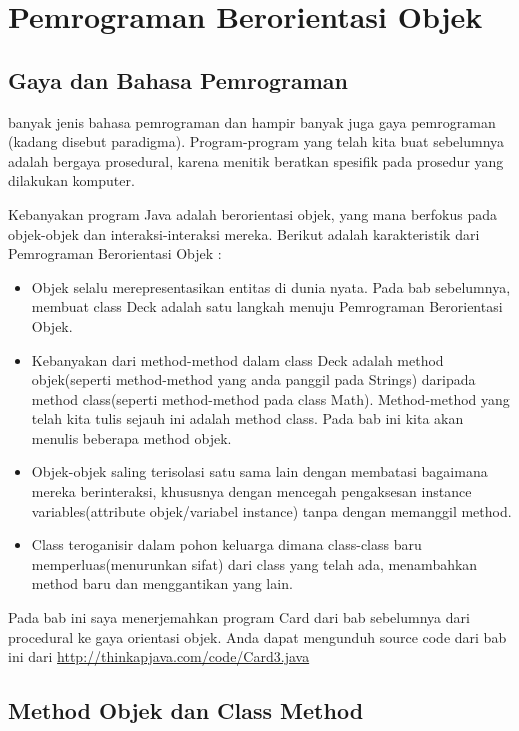 \chapter{Pemrograman Berorientasi Objek}
\section{Gaya dan Bahasa Pemrograman} %

banyak jenis bahasa pemrograman dan hampir banyak juga gaya pemrograman (kadang disebut paradigma). Program-program yang telah kita buat sebelumnya adalah bergaya prosedural, karena menitik beratkan spesifik pada prosedur yang dilakukan komputer.

Kebanyakan program Java adalah berorientasi objek, yang mana berfokus pada objek-objek dan interaksi-interaksi mereka. Berikut adalah karakteristik dari Pemrograman Berorientasi Objek :

\begin{itemize}
	\item{Objek selalu merepresentasikan entitas di dunia nyata. Pada bab sebelumnya, membuat class Deck adalah satu langkah menuju Pemrograman Berorientasi Objek.}
	\item{Kebanyakan dari method-method dalam class Deck adalah method objek(seperti method-method yang anda panggil pada Strings) daripada method class(seperti method-method pada class Math). Method-method yang telah kita tulis sejauh ini adalah method class. Pada bab ini kita akan menulis beberapa method objek.}
	\item{Objek-objek saling terisolasi satu sama lain 	dengan membatasi bagaimana mereka berinteraksi, khususnya dengan mencegah pengaksesan instance variables(attribute objek/variabel instance) tanpa dengan memanggil method.}
	\item{Class teroganisir dalam pohon keluarga dimana class-class baru memperluas(menurunkan sifat) dari class yang telah ada, menambahkan method baru dan menggantikan yang lain.}
\end{itemize}

Pada bab ini saya menerjemahkan program Card dari bab sebelumnya dari procedural ke gaya orientasi objek. Anda dapat mengunduh source code dari bab ini dari \url{http://thinkapjava.com/code/Card3.java}

\section{Method Objek dan Class Method} %

